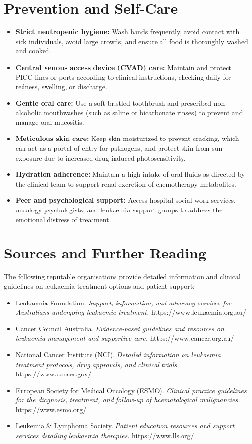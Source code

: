 \section*{Prevention and Self-Care}
\begin{itemize}
    \item \textbf{Strict neutropenic hygiene:} Wash hands frequently, avoid contact with sick individuals, avoid large crowds, and ensure all food is thoroughly washed and cooked.
    \item \textbf{Central venous access device (CVAD) care:} Maintain and protect PICC lines or ports according to clinical instructions, checking daily for redness, swelling, or discharge.
    \item \textbf{Gentle oral care:} Use a soft-bristled toothbrush and prescribed non-alcoholic mouthwashes (such as saline or bicarbonate rinses) to prevent and manage oral mucositis.
    \item \textbf{Meticulous skin care:} Keep skin moisturized to prevent cracking, which can act as a portal of entry for pathogens, and protect skin from sun exposure due to increased drug-induced photosensitivity.
    \item \textbf{Hydration adherence:} Maintain a high intake of oral fluids as directed by the clinical team to support renal excretion of chemotherapy metabolites.
    \item \textbf{Peer and psychological support:} Access hospital social work services, oncology psychologists, and leukaemia support groups to address the emotional distress of treatment.
\end{itemize}

\section*{Sources and Further Reading}
The following reputable organisations provide detailed information and clinical guidelines on leukaemia treatment options and patient support:
\begin{itemize}
    \item Leukaemia Foundation. \textit{Support, information, and advocacy services for Australians undergoing leukaemia treatment.} https://www.leukaemia.org.au/
    \item Cancer Council Australia. \textit{Evidence-based guidelines and resources on leukaemia management and supportive care.} https://www.cancer.org.au/
    \item National Cancer Institute (NCI). \textit{Detailed information on leukaemia treatment protocols, drug approvals, and clinical trials.} https://www.cancer.gov/
    \item European Society for Medical Oncology (ESMO). \textit{Clinical practice guidelines for the diagnosis, treatment, and follow-up of haematological malignancies.} https://www.esmo.org/
    \item Leukemia \& Lymphoma Society. \textit{Patient education resources and support services detailing leukaemia therapies.} https://www.lls.org/
\end{itemize}
